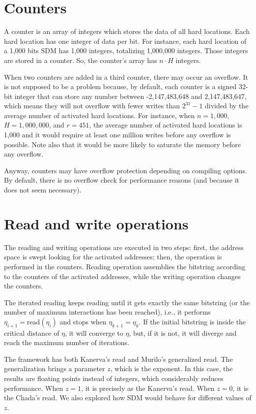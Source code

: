\section{Counters}

A counter is an array of integers which stores the data of all hard locations. Each hard location has one integer of data per bit. For instance, each hard location of a 1,000 bits SDM has 1,000 integers, totalizing 1,000,000 integers. Those integers are stored in a counter. So, the counter's array has $n \cdot H$ integers.

When two counters are added in a third counter, there may occur an overflow. It is not supposed to be a problem because, by default, each counter is a signed 32-bit integer that can store any number between -2,147,483,648 and 2,147,483,647, which means they will not overflow with fewer writes than $2^{31}-1$ divided by the average number of activated hard locations. For instance, when $n=1,000$, $H=1,000,000$, and $r=451$, the average number of activated hard locations is 1,000 and it would require at least one million writes before any overflow is possible.  Note also that it would be more likely to saturate the memory before any overflow.

Anyway, counters may have overflow protection depending on compiling options. By default, there is no overflow check for performance reasons (and because it does not seem necessary).

\section{Read and write operations}

The reading and writing operations are executed in two steps: first, the address space is swept looking for the activated addresses; then, the operation is performed in the counters. Reading operation assemblies the bitstring according to the counters of the activated addresses, while the writing operation changes the counters.

The iterated reading keeps reading until it gets exactly the same bitstring (or the number of maximum interactions has been reached), i.e., it performs $\eta_{i+1} = \text{read}(\eta_i)$ and stops when $\eta_{k+1} = \eta_{k}$. If the initial bitstring is inside the critical distance of $\eta$, it will converge to $\eta$, but, if it is not, it will diverge and reach the maximum number of iterations.

The framework has both Kanerva's read and Murilo's generalized read. The generalization brings a parameter $z$, which is the exponent. In this case, the results are floating points instead of integers, which considerably reduces performance. When $z=1$, it is precisely as the Kanerva's read. When $z=0$, it is the Chada's read. We also explored how SDM would behave for different values of $z$.

